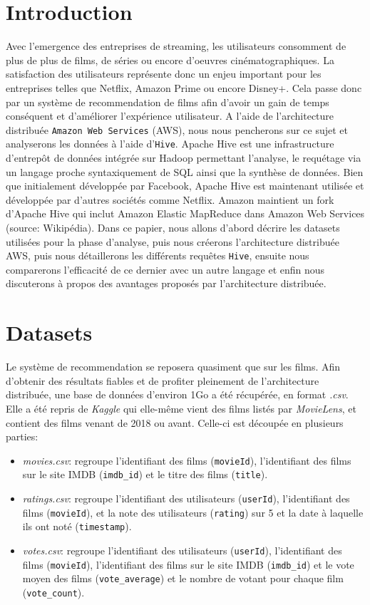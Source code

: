 \documentclass[a4paper, 12pt, oneside]{book}
\begin{document}
\chapter[Introduction]{Introduction}
Avec l'emergence des entreprises de streaming, les utilisateurs consomment de plus de plus de films, de séries ou encore d'oeuvres cinématographiques. La satisfaction des utilisateurs représente donc un enjeu important pour les entreprises telles que Netflix, Amazon Prime ou encore Disney+. Cela passe donc par un système de recommendation de films afin d'avoir un gain de temps conséquent et d'améliorer l'expérience utilisateur.
\newline
A l'aide de l'architecture distribuée \texttt{Amazon Web Services} (AWS), nous nous pencherons sur ce sujet et analyserons les données à l'aide d'\texttt{Hive}. Apache Hive est une infrastructure d’entrepôt de données intégrée sur Hadoop permettant l'analyse, le requétage via un langage proche syntaxiquement de SQL ainsi que la synthèse de données. Bien que initialement développée par Facebook, Apache Hive est maintenant utilisée et développée par d'autres sociétés comme Netflix. Amazon maintient un fork d'Apache Hive qui inclut Amazon Elastic MapReduce dans Amazon Web Services (source: Wikipédia).
\newline
Dans ce papier, nous allons d'abord décrire les datasets utilisées pour la phase d'analyse, puis nous créerons l'architecture distribuée AWS, puis nous détaillerons les différents requêtes \texttt{Hive}, ensuite nous comparerons l'efficacité de ce dernier avec un autre langage et enfin nous discuterons à propos des avantages proposés par l'architecture distribuée.

\chapter[Datasets]{Datasets}
Le système de recommendation se reposera quasiment que sur les films. Afin d'obtenir des résultats fiables et de profiter pleinement de l'architecture distribuée, une base de données d'environ 1Go a été récupérée, en format \textit{.csv}. Elle a été repris de \textit{Kaggle} qui elle-même vient des films listés par \textit{MovieLens}, et contient des films venant de 2018 ou avant. Celle-ci est découpée en plusieurs parties:
\begin{itemize}
	\item \textit{movies.csv}: regroupe l'identifiant des films (\texttt{movieId}), l'identifiant des films sur le site IMDB (\texttt{imdb\_id}) et le titre des films (\texttt{title}).
	\item \textit{ratings.csv}: regroupe l'identifiant des utilisateurs (\texttt{userId}), l'identifiant des films (\texttt{movieId}), et la note des utilisateurs (\texttt{rating}) sur 5 et la date à laquelle ils ont noté (\texttt{timestamp}).
	\item \textit{votes.csv}: regroupe l'identifiant des utilisateurs (\texttt{userId}), l'identifiant des films (\texttt{movieId}), l'identifiant des films sur le site IMDB (\texttt{imdb\_id}) et le vote moyen des films (\texttt{vote\_average}) et le nombre de votant pour chaque film (\texttt{vote\_count}).
\end{itemize}
\end{document}
